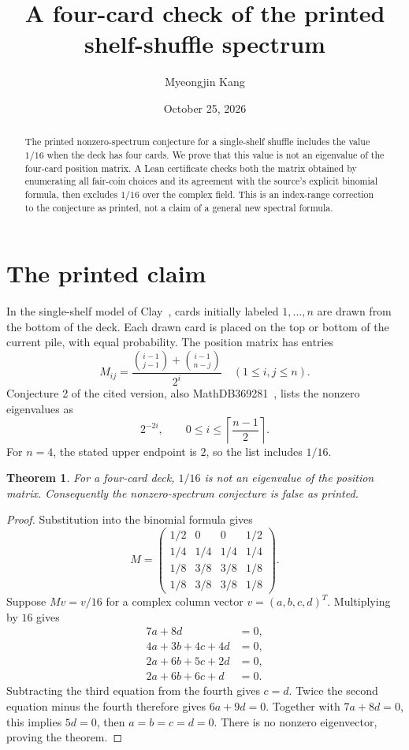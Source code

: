 \documentclass[11pt]{article}
\title{A four-card check of the printed shelf-shuffle spectrum}
\author{Myeongjin Kang}
\date{October 25, 2026}
\newtheorem{theorem}{Theorem}
\begin{document}
\maketitle
\begin{abstract}
The printed nonzero-spectrum conjecture for a single-shelf shuffle includes
the value $1/16$ when the deck has four cards. We prove that this value is
not an eigenvalue of the four-card position matrix. A Lean certificate
checks both the matrix obtained by enumerating all fair-coin choices and
its agreement with the source's explicit binomial formula, then excludes
$1/16$ over the complex field. This is an index-range correction to the
conjecture as printed, not a claim of a general new spectral formula.
\end{abstract}
\section{The printed claim}
In the single-shelf model of Clay~\cite{Clay}, cards initially labeled
$1,\ldots,n$ are drawn from the bottom of the deck. Each drawn card is
placed on the top or bottom of the current pile, with equal probability.
The position matrix has entries
\[
 M_{ij}=\frac{\binom{i-1}{j-1}+\binom{i-1}{n-j}}{2^i}
 \quad (1\leq i,j\leq n).
\]
Conjecture 2 of the cited version, also MathDB369281~\cite{MathDB}, lists
the nonzero eigenvalues as
\[
 2^{-2i},\qquad 0\leq i\leq\left\lceil\frac{n-1}{2}\right\rceil.
\]
For $n=4$, the stated upper endpoint is $2$, so the list includes $1/16$.

\begin{theorem}
For a four-card deck, $1/16$ is not an eigenvalue of the position matrix.
Consequently the nonzero-spectrum conjecture is false as printed.
\end{theorem}
\begin{proof}
Substitution into the binomial formula gives
\[
 M=\begin{pmatrix}
 1/2&0&0&1/2\\
 1/4&1/4&1/4&1/4\\
 1/8&3/8&3/8&1/8\\
 1/8&3/8&3/8&1/8
 \end{pmatrix}.
\]
Suppose $Mv=v/16$ for a complex column vector $v=(a,b,c,d)^T$.
Multiplying by $16$ gives
\begin{align*}
 7a+8d&=0,\\
 4a+3b+4c+4d&=0,\\
 2a+6b+5c+2d&=0,\\
 2a+6b+6c+d&=0.
\end{align*}
Subtracting the third equation from the fourth gives $c=d$.
Twice the second equation minus the fourth therefore gives
$6a+9d=0$. Together with $7a+8d=0$, this implies $5d=0$,
then $a=b=c=d=0$. There is no nonzero eigenvector, proving the theorem.
\end{proof}
\end{document}
